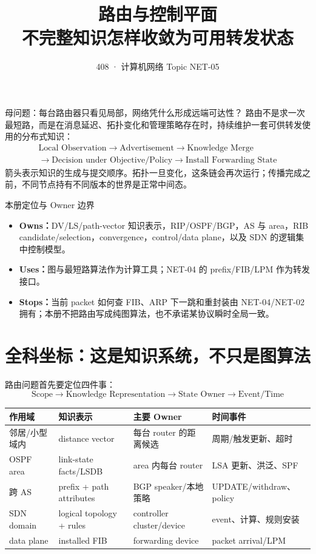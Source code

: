 \documentclass[11pt,a4paper]{ctexart}
\title{\vspace{-1.1cm}\textbf{路由与控制平面}\\[0.4em]\large 不完整知识怎样收敛为可用转发状态}
\author{408 · 计算机网络 Topic NET-05}
\date{}
\newcommand{\kw}[1]{\textbf{\color{deep}#1}}
\begin{document}
\maketitle

\begin{corebox}{母问题：每台路由器只看见局部，网络凭什么形成远端可达性？}
路由不是求一次最短路，而是在消息延迟、拓扑变化和管理策略存在时，持续维护一套可供转发使用的分布式知识：
\[
\boxed{\begin{gathered}
\text{Local Observation}\to\text{Advertisement}\to\text{Knowledge Merge}\\
\to\text{Decision under Objective/Policy}\to\text{Install Forwarding State}
\end{gathered}}
\]
箭头表示知识的生成与提交顺序。拓扑一旦变化，这条链会再次运行；传播完成之前，不同节点持有不同版本的世界是正常中间态。
\end{corebox}

\begin{methodbox}{本册定位与 Owner 边界}
\begin{itemize}
  \item \kw{Owns：}DV/LS/path-vector 知识表示，RIP/OSPF/BGP，AS 与 area，RIB candidate/selection，convergence，control/data plane，以及 SDN 的逻辑集中控制模型。
  \item \kw{Uses：}图与最短路算法作为计算工具；NET-04 的 prefix/FIB/LPM 作为转发接口。
  \item \kw{Stops：}当前 packet 如何查 FIB、ARP 下一跳和重封装由 NET-04/NET-02 拥有；本册不把路由写成纯图算法，也不承诺某协议瞬时全局一致。
\end{itemize}
\end{methodbox}

\tableofcontents
\newpage

\section{全科坐标：这是知识系统，不只是图算法}

路由问题首先要定位四件事：
\[
\boxed{\text{Scope}\to\text{Knowledge Representation}\to\text{State Owner}\to\text{Event/Time}}
\]

\begin{center}
\small
\begin{tabularx}{\linewidth}{L{2.0cm}L{3.0cm}L{3.0cm}Y}
\toprule
作用域 & 知识表示 & 主要 Owner & 时间事件\\
\midrule
邻居/小型域内 & distance vector & 每台 router 的距离候选 & 周期/触发更新、超时\\
OSPF area & link-state facts/LSDB & area 内每台 router & LSA 更新、洪泛、SPF\\
跨 AS & prefix + path attributes & BGP speaker/本地策略 & UPDATE/withdraw、policy\\
SDN domain & logical topology + rules & controller cluster/device & event、计算、规则安装\\
data plane & installed FIB & forwarding device & packet arrival/LPM\\
\bottomrule
\end{tabularx}
\end{center}
\end{document}
